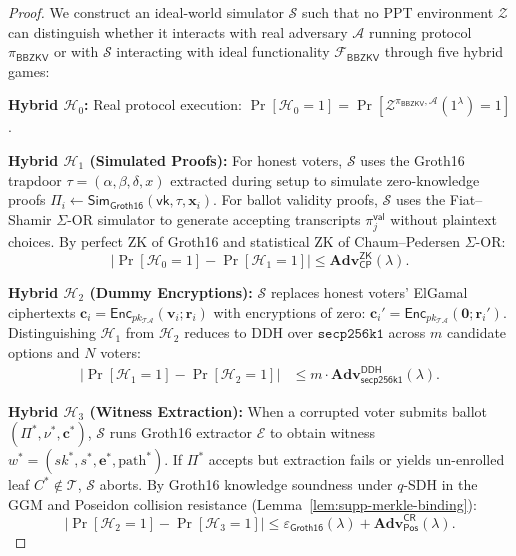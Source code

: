\documentclass[10pt,letterpaper,journal]{IEEEtran}
\begin{document}
\begin{proof}
We construct an ideal-world simulator $\mathcal{S}$ such that no PPT environment $\mathcal{Z}$ can distinguish whether it interacts with real adversary $\mathcal{A}$ running protocol $\pi_{\mathsf{BBZKV}}$ or with $\mathcal{S}$ interacting with ideal functionality $\mathcal{F}_{\mathsf{BBZKV}}$ through five hybrid games:

\textbf{Hybrid $\mathcal{H}_0$:} Real protocol execution: $\Pr[\mathcal{H}_0 = 1] = \Pr[\mathcal{Z}^{\pi_{\mathsf{BBZKV}}, \mathcal{A}}(1^\lambda) = 1]$.

\textbf{Hybrid $\mathcal{H}_1$ (Simulated Proofs):} For honest voters, $\mathcal{S}$ uses the Groth16 trapdoor $\tau = (\alpha, \beta, \delta, x)$ extracted during setup to simulate zero-knowledge proofs $\Pi_i \leftarrow \mathsf{Sim}_{\mathsf{Groth16}}(\mathsf{vk}, \tau, \mathbf{x}_i)$. For ballot validity proofs, $\mathcal{S}$ uses the Fiat--Shamir $\Sigma$-OR simulator to generate accepting transcripts $\pi_j^{\mathsf{val}}$ without plaintext choices. By perfect ZK of Groth16 and statistical ZK of Chaum--Pedersen $\Sigma$-OR:
\begin{equation}
  |\Pr[\mathcal{H}_0 = 1] - \Pr[\mathcal{H}_1 = 1]| \leq \mathbf{Adv}_{\mathsf{CP}}^{\mathsf{ZK}}(\lambda).
\end{equation}

\textbf{Hybrid $\mathcal{H}_2$ (Dummy Encryptions):} $\mathcal{S}$ replaces honest voters' ElGamal ciphertexts $\mathbf{c}_i = \mathsf{Enc}_{pk_{\mathcal{TA}}}(\mathbf{v}_i; \mathbf{r}_i)$ with encryptions of zero: $\mathbf{c}_i' = \mathsf{Enc}_{pk_{\mathcal{TA}}}(\mathbf{0}; \mathbf{r}_i')$. Distinguishing $\mathcal{H}_1$ from $\mathcal{H}_2$ reduces to DDH over $\mathtt{secp256k1}$ across $m$ candidate options and $N$ voters:
\begin{equation}
\begin{aligned}
  |\Pr[\mathcal{H}_1 = 1] - \Pr[\mathcal{H}_2 = 1]|
  &\leq m \cdot \mathbf{Adv}_{\mathsf{secp256k1}}^{\mathsf{DDH}}(\lambda).
\end{aligned}
\end{equation}

\textbf{Hybrid $\mathcal{H}_3$ (Witness Extraction):} When a corrupted voter submits ballot $(\Pi^\ast, \nu^\ast, \mathbf{c}^\ast)$, $\mathcal{S}$ runs Groth16 extractor $\mathcal{E}$ to obtain witness $w^\ast = (sk^\ast, s^\ast, \mathbf{e}^\ast, \mathrm{path}^\ast)$. If $\Pi^\ast$ accepts but extraction fails or yields un-enrolled leaf $C^\ast \notin \mathcal{T}$, $\mathcal{S}$ aborts. By Groth16 knowledge soundness under $q$-SDH in the GGM and Poseidon collision resistance (Lemma~\ref{lem:supp-merkle-binding}):
\begin{equation}
  |\Pr[\mathcal{H}_2 = 1] - \Pr[\mathcal{H}_3 = 1]| \leq \varepsilon_{\mathsf{Groth16}}(\lambda) + \mathbf{Adv}_{\mathsf{Pos}}^{\mathsf{CR}}(\lambda).
\end{equation}


\end{proof}
\end{document}
